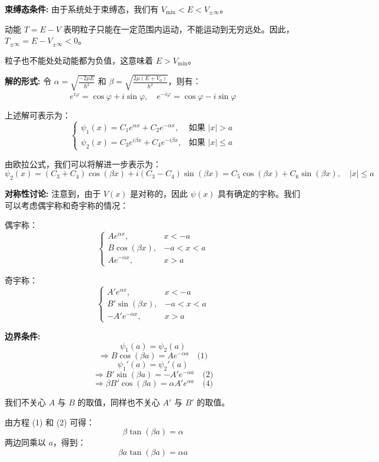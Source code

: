 \documentclass[lang=cn,10pt]{elegantbook}
\begin{document}
\begin{solution}
	\textbf{束缚态条件:}
	由于系统处于束缚态，我们有 $V_{\text{min}} < E < V_{\pm\infty}$。
	
	动能 $T = E - V$ 表明粒子只能在一定范围内运动，不能运动到无穷远处。因此，$T_{\pm\infty} = E - V_{\pm\infty} < 0$。
	
	粒子也不能处处动能都为负值，这意味着 $E > V_{\text{min}}$。
	
	\textbf{解的形式:}
	令 $\alpha = \sqrt{\frac{-2\mu E}{\hbar^2}}$ 和 $\beta = \sqrt{\frac{2\mu(E+V_0)}{\hbar^2}}$，则有：
	\[
	e^{i\varphi} = \cos\varphi + i\sin\varphi, \quad e^{-i\varphi} = \cos\varphi - i\sin\varphi
	\]
	
	上述解可表示为：
	\[
	\begin{cases} 
		\psi_1(x) = C_1 e^{\alpha x} + C_2 e^{-\alpha x}, & \text{如果 } |x| > a \\
		\psi_2(x) = C_3 e^{i\beta x} + C_4 e^{-i\beta x}, & \text{如果 } |x| \leq a
	\end{cases}
	\]
	
	由欧拉公式，我们可以将解进一步表示为：
	\[
	\psi_2(x) = (C_3 + C_4) \cos(\beta x) + i(C_3 - C_4) \sin(\beta x) = C_5 \cos(\beta x) + C_6 \sin(\beta x), \quad |x| \leq a
	\]
	
	\textbf{对称性讨论:}
	注意到，由于 $V(x)$ 是对称的，因此 $\psi(x)$ 具有确定的宇称。我们可以考虑偶宇称和奇宇称的情况：
	
	偶宇称：
	\[
	\begin{cases} 
		A e^{\alpha x}, & x < -a \\
		B \cos(\beta x), & -a < x < a \\
		A e^{-\alpha x}, & x > a
	\end{cases}
	\]
	
	奇宇称：
	\[
	\begin{cases} 
		A' e^{\alpha x}, & x < -a \\
		B' \sin(\beta x), & -a < x < a \\
		-A' e^{-\alpha x}, & x > a
	\end{cases}
	\]
	
\textbf{边界条件:}
\[
\psi_1(a) = \psi_2(a)
\]
\[
\Rightarrow B \cos(\beta a) = A e^{-\alpha a} \quad \text{(1)}
\]
\[
\psi_1'(a) = \psi_2'(a)
\]
\[
\Rightarrow B' \sin(\beta a) = -A' e^{-\alpha a} \quad \text{(2)}
\]
\[
\Rightarrow \beta B' \cos(\beta a) = \alpha A' e^{\alpha a} \quad \text{(4)}
\]

我们不关心 \(A\) 与 \(B\) 的取值，同样也不关心 \(A'\) 与 \(B'\) 的取值。

由方程 (1) 和 (2) 可得：
\[
\beta \tan(\beta a) = \alpha
\]
两边同乘以 \(a\)，得到：
\[
\beta a \tan(\beta a) = \alpha a
\]


\end{solution}
\end{document}
